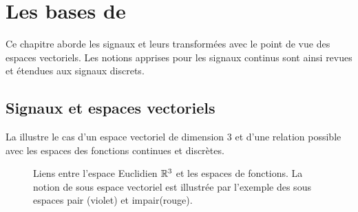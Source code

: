\chapter{Les bases de \Fourier}
\label{chap:fourier}
Ce chapitre aborde les signaux et leurs transformées avec le point de
vue des espaces vectoriels. Les notions apprises pour les signaux
continus sont ainsi revues et étendues aux signaux discrets.



\section{Signaux et espaces vectoriels}

La  illustre le cas d'un espace
vectoriel de dimension 3 et d'une relation possible avec les espaces
des fonctions continues et discrètes.


\begin{figure}[htbp]
  \centering {}
  \caption{Liens entre l'espace Euclidien $\mathbb{R}^3$ et les espaces de
    fonctions. La notion de sous espace vectoriel est illustrée par
    l'exemple des sous espaces pair (violet) et impair(rouge).}
  \label{fig:espaces_vectoriels}
\end{figure}


